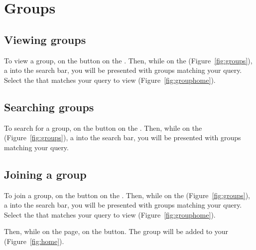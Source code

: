 \section{Groups}
\label{sec:groups}

\subsection{Viewing groups}
\label{sec:groups-view}
To view a group,  on the  button on the \quicknav. Then, while on the  (Figure~\ref{fig:groups}),  a  into the search bar, you will be presented with groups matching your query.  Select the  that matches your query to view  (Figure~\ref{fig:grouphome}).

\subsection{Searching groups}
\label{sec:groups-search}
To search for a group,  on the  button on the \quicknav. Then, while on the  (Figure~\ref{fig:groups}),  a  into the search bar, you will be presented with groups matching your query.


\subsection{Joining a group}
\label{sec:groups-join}
To join a group,  on the  button on the \quicknav. Then, while on the  (Figure~\ref{fig:groups}),  a  into the search bar, you will be presented with groups matching your query.  Select the  that matches your query to view  (Figure~\ref{fig:grouphome}).

Then, while on the  page,  on the  button. The group will be added to your  (Figure~\ref{fig:home}).   

